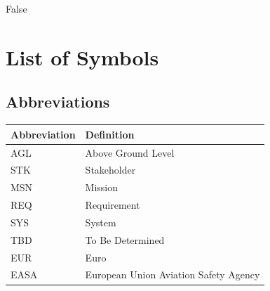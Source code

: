 
\if False
\chapter*{List of Symbols}\label{ch:list-of-symbols}

\section*{Abbreviations}

\begin{longtable}{p{2.5cm}p{8cm}}
    \toprule
    Abbreviation & Definition \\
    \midrule\endhead %
    AGL & Above Ground Level \\
    STK & Stakeholder \\
    MSN & Mission \\
    REQ & Requirement \\
    SYS & System \\   
    TBD & To Be Determined \\
    EUR & Euro \\
    EASA & European Union Aviation Safety Agency \\
    
    \bottomrule
\end{longtable}


